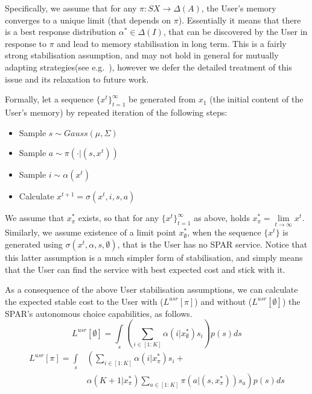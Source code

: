 \documentclass{msdm2012}
\begin{document}
Specifically, we assume that for any $\pi:SX\rightarrow\Delta(A)$, the
User's memory converges to a unique limit (that depends on
$\pi$). Essentially it means that there is a best response
distribution $\alpha^*\in\Delta(I)$, that can be discovered by the
User in response to $\pi$ and lead to memory stabilisation in long
term. This is a fairly strong stabilisation assumption, and may not
hold in general for mutually adapting strategies(see
e.g.~\cite{zinkevich_greenwald_littman_2005}), however we defer the
detailed treatment of this issue and its relaxation to future work.

Formally, let a sequence $\{x^t\}_{t=1}^\infty$ be generated
from $x_1$ (the initial content of the User's memory) by repeated
iteration of the following steps:
\begin{itemize}
\item Sample $s\sim Gauss(\mu,\Sigma)$
\item Sample $a\sim\pi(\cdot|(s,x^t))$
\item Sample $i\sim \alpha(x^t)$
\item Calculate $x^{t+1}=\sigma(x^t,i,s,a)$
\end{itemize}
We assume that $x^*_\pi$ exists, so that for any
$\{x^t\}_{t=1}^\infty$ as above, holds
$x^*_\pi=\lim\limits_{t\rightarrow\infty}x^t$. Similarly, we assume
existence of a limit point $x^*_\emptyset$, when the sequence
$\{x^t\}$ is generated using $\sigma(x^t,\alpha,s,\emptyset)$, that is
the User has no SPAR service. Notice that this latter assumption is a
much simpler form of stabilisation, and simply means that the User can
find the service with best expected cost and stick with it.

As a consequence of the above User stabilisation assumptions, we can
calculate the expected stable cost to the User with
($L^{usr}[\pi]$) and without ($L^{usr}[\emptyset]$) the SPAR's
autonomous choice capabilities, as follows.
\begin{equation*}L^{usr}[\emptyset] = \int\limits_s\left(
\sum\limits_{i\in[1:K]}\alpha(i|x^*_\emptyset)s_i
\right)p(s)ds\end{equation*}
\begin{equation*}\begin{split}
L^{usr}[\pi] = \int\limits_s&\left(
\sum\limits_{i\in[1:K]}\alpha(i|x^*_\pi)s_i+\right.\\
&\left.\alpha(K+1|x^*_\pi)\sum\limits_{a\in[1:K]}\pi(a|(s,x^*_\pi))s_a
\right)p(s)ds\end{split}
\end{equation*}
\end{document}
